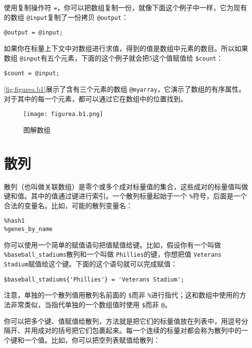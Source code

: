 使用复制操作符 \verb|=|，你可以把数组复制一份，就像下面这个例子中一样，它为现有的数组 \verb|@input|复制了一份拷贝 \verb|@output|：

\begin{lstlisting}
@output = @input;
\end{lstlisting}

如果你在标量上下文中对数组进行求值，得到的值是数组中元素的数目。所以如果数组 \verb|@input|有五个元素，下面的这个例子就会把5这个值赋值给 \verb|$count|：

\begin{lstlisting}
$count = @input;
\end{lstlisting}

\autoref{fig:figurea.b1}展示了含有三个元素的数组 \verb|@myarray|，它演示了数组的有序属性。对于其中的每一个元素，都可以通过它在数组中的位置找到。

\begin{figure}
  \centering
  \texttt{[image: figurea.b1.png]}
  \caption{图解数组}
  \label{fig:figurea.b1}
 \end{figure}{}

\section{散列}
散列（也叫做关联数组）是零个或多个成对标量值的集合，这些成对的标量值叫做键和值。其中的值通过键进行索引。一个散列标量起始于一个 \verb|%|符号，后面是一个合法的变量名。比如，可能的散列变量名：

\begin{lstlisting}
%hash1
%genes_by_name
\end{lstlisting}

你可以使用一个简单的赋值语句把值赋值给键。比如，假设你有一个叫做 \verb|%baseball_stadiums|散列和一个叫做 \verb|Phillies|的键，你想把值 \verb|Veterans Stadium|赋值给这个键。下面的这个语句就可以完成赋值：

\begin{lstlisting}
$baseball_stadiums{'Phillies'} = 'Veterans Stadium';
\end{lstlisting}

注意，单独的一个散列值用散列名前面的 \verb|$|而非 \verb|%|进行指代；这和数组中使用的方法非常类似，当指代单独的一个数组值时使用 \verb|$|而非 \verb|@|。

你可以把多个键、值赋值给散列，方法就是把它们的标量值放在列表中，用逗号分隔开、并用成对的括号把它们包裹起来。每一个连续的标量对都会称为散列中的一个键和一个值。比如，你可以把空列表赋值给散列：

